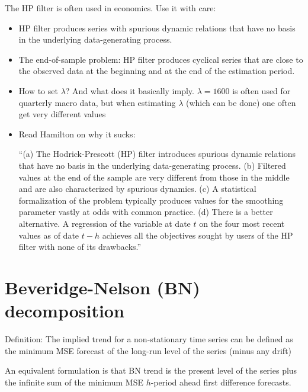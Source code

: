 \documentclass[10pt]{article}
\begin{document}
The HP filter is often used in economics. Use it with care: 
\begin{itemize}
    \item HP filter produces series with spurious dynamic relations that have no basis in the underlying data-generating process. 
    \item The end-of-sample problem: HP filter produces cyclical series that are close to the observed data at the beginning and at the end of the estimation period. 
    \item How to set $\lambda $? And what does it basically imply. $\lambda = 1600 $ is often used for quarterly macro data, but when estimating $\lambda $ (which can be done) one often get very different values 
    \item Read Hamilton on why it sucks: 

    ``(a) The Hodrick-Prescott (HP) ﬁlter introduces spurious dynamic relations that have no basis in the underlying data-generating
    process. (b) Filtered values at the end of the sample are very different from
    those in the middle and are also characterized by spurious dynamics. (c)
    A statistical formalization of the problem typically produces values for the
    smoothing parameter vastly at odds with common practice. (d) There is a
    better alternative. A regression of the variable at date $t$ on the four most
    recent values as of date $t - h$ achieves all the objectives sought by users of
    the HP ﬁlter with none of its drawbacks.''
\end{itemize}
\newpage 
\section{Beveridge-Nelson (BN) decomposition}
Definition: The implied trend for a non-stationary time series can be defined as the minimum MSE forecast of the long-run level of the series (minus any drift)

An equivalent formulation is that BN trend is the present level of the series plus the infinite sum of the minimum MSE $h $-period ahead first difference forecasts. 
\end{document}
